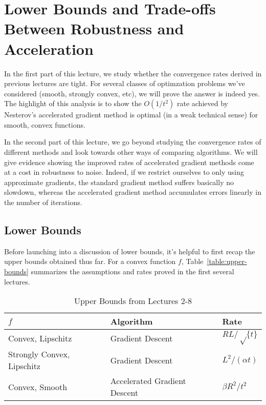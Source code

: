 \section{Lower Bounds and Trade-offs Between Robustness and Acceleration}

In the first part of this lecture, we study whether the convergence rates
derived in previous lectures are tight. For several classes of optimzation
problems we've considered (smooth, strongly convex, etc), we will prove the
answer is indeed yes. The highlight of this analysis is to show the $O(1/t^2)$
rate achieved by Nesterov's accelerated gradient method is optimal (in a weak
technical sense) for smooth, convex functions. 

In the second part of this lecture, we go beyond studying the convergence
rates of different methods and look towards other ways of comparing algorithms.
We will give evidence showing the improved rates of accelerated gradient methods
come at a cost in robustness to noise. Indeed, if we restrict ourselves to
only using approximate gradients, the standard gradient method suffers basically no
slowdown, whereas the accelerated gradient method accumulates errors linearly in
the number of iterations.

\subsection{Lower Bounds}
Before launching into a discussion of lower bounds, it's helpful to first recap
the upper bounds obtained thus far. For a convex function $f$,
Table~\eqref{table:upper-bounds} summarizes the assumptions and rates proved in
the first several lectures. 
~
\begin{table}[]
\centering
\caption{Upper Bounds from Lectures 2-8}
\label{table:upper-bounds}
\begin{tabular}{|l|l|l|}
\hline
$f$                        & Algorithm                    & Rate                                            \\ \hline
Convex, Lipschitz          & Gradient Descent             & $RL / \sqrt\{t\}$                               \\ \hline
Strongly Convex, Lipschitz & Gradient Descent             & $L^2 / (\alpha t)$                \\ \hline
Convex, Smooth             & Accelerated Gradient Descent & $\beta R^2 / t^2$ \\ \hline
\end{tabular}
\end{table}  

